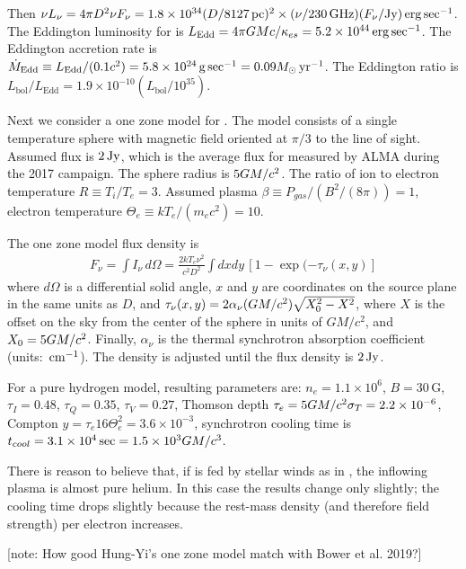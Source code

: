 \documentclass[twocolumn,tighten,dvipsnames]{aastex63}
\newcommand\note[1]{{\color{OliveGreen}[note: #1]}}
\begin{document}
Then
$ \nu L_\nu
= 4 \pi D^2 \nu F_\nu
= 1.8 \times 10^{34} (D/8127 {\rm \, pc})^2 \times\allowbreak
  (\nu/230 {\rm \, GHz})(F_\nu/{\rm Jy}) {\rm \, erg} \sec^{-1}$.
The Eddington luminosity for \sgra is
$ L_\mathrm{Edd}
= 4\pi G{M} c/\kappa_{es}
= 5.2 \times 10^{44}\allowbreak{\rm \, erg}\sec^{-1}$.
The Eddington accretion rate is
$ \dot{{M}}_\mathrm{Edd}
\equiv L_\mathrm{Edd}/(0.1 c^2)
= 5.8 \times 10^{24} {\rm \, g} \sec^{-1}
= 0.09 {M_\odot} {\rm \, yr}^{-1}$.
The Eddington ratio is
$ L_\mathrm{bol}/L_\mathrm{Edd}
= 1.9 \times 10^{-10} (L_\mathrm{bol}/10^{35})$.

Next we consider a one zone model for \sgra.
The model consists of a single temperature sphere with magnetic field
oriented at $\pi/3$ to the line of sight.
Assumed flux is $2{\rm \, Jy}$, which is the average flux for \sgra measured
by ALMA during the 2017 campaign.
The sphere radius is
$5 G{M}/c^2$.
The ratio of ion to electron temperature
$R \equiv T_i/T_e = 3$.
Assumed plasma
$\beta \equiv P_{gas}/(B^2/(8\pi)) = 1$,
electron temperature
$\Theta_e \equiv k T_e/(m_e c^2) = 10$.

The one zone model flux density is
\begin{align}
  F_\nu = \int I_\nu \, d\Omega =
  \frac{2 k T_e \nu^2}{c^2 D^2} \int dx dy\,\left[1-\exp(-\tau_\nu(x,y)\right]
\end{align}
where $d\Omega$ is a differential solid angle, $x$ and $y$ are
coordinates on the source plane in the same units as $D$, and
$\tau_\nu(x,y) = 2 \alpha_\nu (G{M}/c^2) \sqrt{X_0^2 - X^2}$,
where $X$ is the offset on the sky from the center of the sphere in
units of
$GM/c^2$, and $X_0 = 5 G{M}/c^2$.
Finally, $\alpha_\nu$ is the thermal synchrotron absorption
coefficient (units: ${\rm \, cm}^{-1}$).
The density is adjusted until the flux density is $2{\rm \, Jy}$.

For a pure hydrogen model, resulting parameters are: $n_e = 1.1 \times
10^6$, $B = 30\,\mathrm{G}$, $\tau_I = 0.48$, $\tau_Q = 0.35 $,
$\tau_V = 0.27$, Thomson depth $\tau_e = 5 G{M}/c^2 \sigma_T = 2.2
\times 10^{-6}$, Compton $y = \tau_e 16 \Theta_e^2 = 3.6 \times
10^{-3}$, synchrotron cooling time is $t_{cool} = 3.1 \times 10^4\sec
= 1.5 \times 10^3 G{M}/c^3$.

There is reason to believe that, if \sgra is fed by stellar winds as
in \citet{2019MNRAS.482L.123R}, the inflowing plasma is almost pure
helium.
In this case the results change only slightly; the cooling time drops
slightly because the rest-mass density (and therefore field strength)
per electron increases.

\note{How good Hung-Yi's one zone model match with Bower et al. 2019?}
\end{document}
